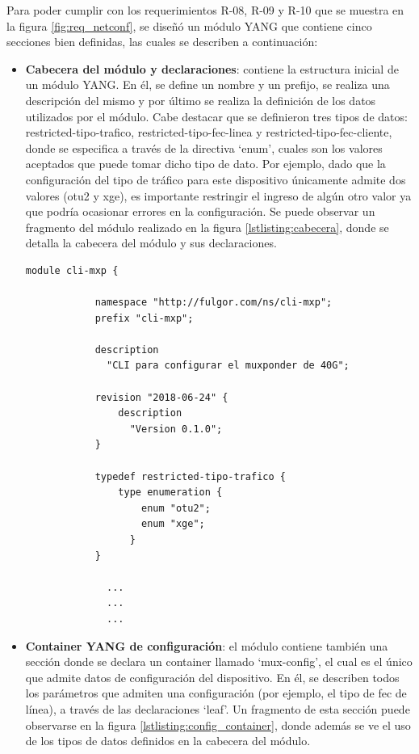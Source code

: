 Para poder cumplir con los requerimientos R-08, R-09 y R-10 que se muestra en la figura \ref{fig:req_netconf}, se diseñó un módulo YANG que contiene cinco secciones bien definidas, las cuales se describen a continuación: 

\begin{itemize}
	\item \textbf{Cabecera del módulo y declaraciones}: contiene la estructura inicial de un módulo YANG. En él, se define un nombre y un prefijo, se realiza una descripción del mismo y por último se realiza la definición de los datos utilizados por el módulo. Cabe destacar que se definieron tres tipos de datos: restricted-tipo-trafico, restricted-tipo-fec-linea y restricted-tipo-fec-cliente, donde se especifica a través de la directiva ‘enum’, cuales son los valores aceptados que puede tomar dicho tipo de dato. Por ejemplo, dado que la configuración del tipo de tráfico para este dispositivo únicamente admite dos valores (otu2 y xge), es importante restringir el ingreso de algún otro valor ya que podría ocasionar errores en la configuración. Se puede observar un fragmento del módulo realizado en la figura \ref{lstlisting:cabecera}, donde se detalla la cabecera del módulo y sus declaraciones.  

    \begin{lstlisting}[language=SHELXL, caption=Cabecera del módulo YANG., label=lstlisting:cabecera]
        module cli-mxp {

            namespace "http://fulgor.com/ns/cli-mxp";
            prefix "cli-mxp";
        
            description
              "CLI para configurar el muxponder de 40G";
        
            revision "2018-06-24" {
                description
                  "Version 0.1.0";
            }
            
            typedef restricted-tipo-trafico {
                type enumeration {
                    enum "otu2";
                    enum "xge";
                  }
            }
        
              ...
              ...
              ...
    \end{lstlisting}

    \item \textbf{Container YANG de configuración}: el módulo contiene también una sección donde se declara un container llamado ‘mux-config’, el cual es el único que admite datos de configuración del dispositivo. En él, se describen todos los parámetros que admiten una configuración (por ejemplo, el tipo de fec de línea), a través de las declaraciones ‘leaf’. Un fragmento de esta sección puede observarse en la figura \ref{lstlisting:config_container}, donde además se ve el uso de los tipos de datos definidos en la cabecera del módulo.
  

\end{itemize}
